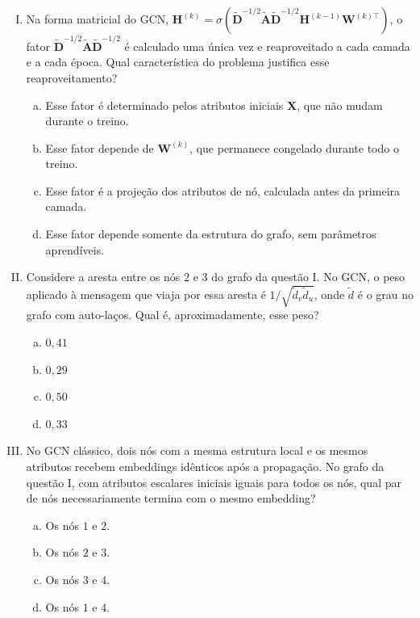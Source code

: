 \documentclass{dlproblemset}
\begin{document}
\begin{enumerate}[I)]
    \item Na forma matricial do GCN, $\mathbf{H}^{(k)} = \sigma(\tilde{\mathbf{D}}^{-1/2} \tilde{\mathbf{A}} \tilde{\mathbf{D}}^{-1/2} \mathbf{H}^{(k-1)} \mathbf{W}^{(k)\top})$, o fator $\tilde{\mathbf{D}}^{-1/2} \tilde{\mathbf{A}} \tilde{\mathbf{D}}^{-1/2}$ é calculado uma única vez e reaproveitado a cada camada e a cada época. Qual característica do problema justifica esse reaproveitamento?
    \begin{enumerate}[(a)]
        \item Esse fator é determinado pelos atributos iniciais $\mathbf{X}$, que não mudam durante o treino.
        \item Esse fator depende de $\mathbf{W}^{(k)}$, que permanece congelado durante todo o treino.
        \item Esse fator é a projeção dos atributos de nó, calculada antes da primeira camada.
        \item Esse fator depende somente da estrutura do grafo, sem parâmetros aprendíveis.
    \end{enumerate}

    \item Considere a aresta entre os nós $2$ e $3$ do grafo da questão I. No GCN, o peso aplicado à mensagem que viaja por essa aresta é $1/\sqrt{\tilde d_v \tilde d_u}$, onde $\tilde d$ é o grau no grafo com auto-laços. Qual é, aproximadamente, esse peso?
    \begin{enumerate}[(a)]
        \item $0{,}41$
        \item $0{,}29$
        \item $0{,}50$
        \item $0{,}33$
    \end{enumerate}

    \item No GCN clássico, dois nós com a mesma estrutura local e os mesmos atributos recebem embeddings idênticos após a propagação. No grafo da questão I, com atributos escalares iniciais iguais para todos os nós, qual par de nós necessariamente termina com o mesmo embedding?
    \begin{enumerate}[(a)]
        \item Os nós $1$ e $2$.
        \item Os nós $2$ e $3$.
        \item Os nós $3$ e $4$.
        \item Os nós $1$ e $4$.
    \end{enumerate}


\end{enumerate}
\end{document}
